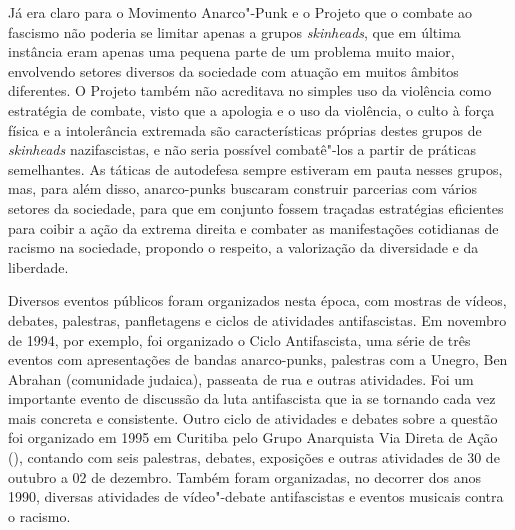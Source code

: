 Já era claro para o Movimento Anarco"-Punk e o Projeto  que o combate ao fascismo não poderia se limitar apenas a grupos \emph{skinheads}, que em última instância eram apenas uma pequena parte de um problema muito maior, envolvendo setores diversos da sociedade com atuação em muitos âmbitos diferentes. O Projeto  também não acreditava no simples uso da violência como estratégia de combate, visto que a apologia e o uso da violência, o culto à força física e a intolerância extremada são características próprias destes grupos de \emph{skinheads} nazifascistas, e não seria possível combatê"-los a partir de práticas semelhantes. As táticas de autodefesa sempre estiveram em pauta nesses grupos, mas, para além disso, anarco-punks buscaram construir parcerias com vários setores da sociedade, para que em conjunto fossem traçadas estratégias eficientes para coibir a ação da extrema direita e combater as manifestações cotidianas de racismo na sociedade, propondo o respeito, a valorização da diversidade e da liberdade.

Diversos eventos públicos foram organizados nesta época, com mostras de vídeos, debates, palestras, panfletagens e ciclos de atividades antifascistas. Em novembro de 1994, por exemplo, foi organizado o Ciclo Antifascista, uma série de três eventos com apresentações de bandas anarco-punks, palestras com a Unegro, Ben Abrahan (comunidade judaica), passeata de rua e outras atividades. Foi um importante evento de discussão da luta antifascista que ia se tornando cada vez mais concreta e consistente.  Outro ciclo de atividades e debates sobre a questão foi organizado em 1995 em Curitiba pelo Grupo Anarquista Via Direta de Ação (), contando com seis palestras, debates, exposições e outras atividades de 30 de outubro a 02 de dezembro. Também foram organizadas, no decorrer dos anos 1990, diversas atividades de vídeo"-debate antifascistas e eventos musicais contra o racismo.


